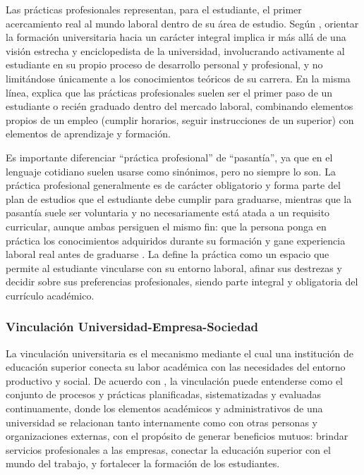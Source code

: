 Las prácticas profesionales representan, para el estudiante, el primer acercamiento real al mundo laboral dentro de su área de estudio. Según \textcite{torresbugdud2007}, orientar la formación universitaria hacia un carácter integral implica ir más allá de una visión estrecha y enciclopedista de la universidad, involucrando activamente al estudiante en su propio proceso de desarrollo personal y profesional, y no limitándose únicamente a los conocimientos teóricos de su carrera. En la misma línea, \textcite{gardey2015} explica que las prácticas profesionales suelen ser el primer paso de un estudiante o recién graduado dentro del mercado laboral, combinando elementos propios de un empleo (cumplir horarios, seguir instrucciones de un superior) con elementos de aprendizaje y formación.

Es importante diferenciar ``práctica profesional'' de ``pasantía'', ya que en el lenguaje cotidiano suelen usarse como sinónimos, pero no siempre lo son. La práctica profesional generalmente es de carácter obligatorio y forma parte del plan de estudios que el estudiante debe cumplir para graduarse, mientras que la pasantía suele ser voluntaria y no necesariamente está atada a un requisito curricular, aunque ambas persiguen el mismo fin: que la persona ponga en práctica los conocimientos adquiridos durante su formación y gane experiencia laboral real antes de graduarse \parencite{westreicher2020}. La \textcite{urosario2015} define la práctica como un espacio que permite al estudiante vincularse con su entorno laboral, afinar sus destrezas y decidir sobre sus preferencias profesionales, siendo parte integral y obligatoria del currículo académico.

\subsubsection{Vinculación Universidad-Empresa-Sociedad}

La vinculación universitaria es el mecanismo mediante el cual una institución de educación superior conecta su labor académica con las necesidades del entorno productivo y social. De acuerdo con \textcite{bei1997}, la vinculación puede entenderse como el conjunto de procesos y prácticas planificadas, sistematizadas y evaluadas continuamente, donde los elementos académicos y administrativos de una universidad se relacionan tanto internamente como con otras personas y organizaciones externas, con el propósito de generar beneficios mutuos: brindar servicios profesionales a las empresas, conectar la educación superior con el mundo del trabajo, y fortalecer la formación de los estudiantes.

